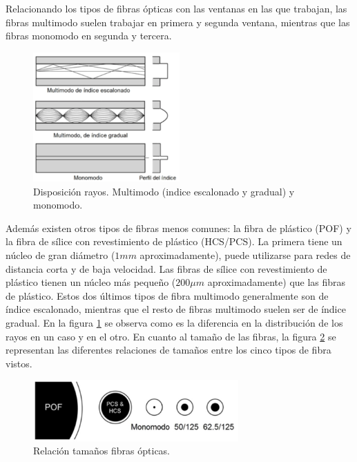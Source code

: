  	Relacionando los tipos de fibras ópticas con las ventanas en las que trabajan, las fibras multimodo suelen trabajar en primera y segunda ventana, mientras que las fibras monomodo en segunda y tercera. 

	  	\begin{figure}[H]
		\centering
		\includegraphics[width=0.5\textwidth]{./img/transFO-esc-grad}
		\caption{Disposición rayos. Multimodo (indice escalonado y gradual) y monomodo. \cite{FOA} } 
		\label{fig:indiceMultimodo}
		\end{figure}
	
 	Además existen otros tipos de fibras menos comunes: la fibra de plástico (POF) y la fibra de sílice con revestimiento de plástico (HCS/PCS). La primera tiene un núcleo de gran diámetro ($1mm$ aproximadamente), puede utilizarse para redes de distancia corta y de baja velocidad. Las fibras de sílice con revestimiento de plástico tienen un núcleo más pequeño ($200\mu m$ aproximadamente) que las fibras de plástico. Estos dos últimos tipos de fibra multimodo generalmente son de índice escalonado, mientras que el resto de fibras multimodo suelen ser de índice gradual. En la figura \ref{fig:indiceMultimodo} se observa como es la diferencia en la distribución de los rayos en un caso y en el otro. En cuanto al tamaño de las fibras, la figura \ref{fig:otrosTiposFO} se representan las diferentes relaciones de tamaños entre los cinco tipos de fibra vistos. \cite{FOA}
 	 	
 	 \begin{figure}[H]
 	 	\centering
 	 	\includegraphics[width=0.7\textwidth]{./img/tiposFO}
 	 	\caption{Relación tamaños fibras ópticas. \cite{FOA} } 
 	 	\label{fig:otrosTiposFO}
 	 \end{figure} 	
  	
